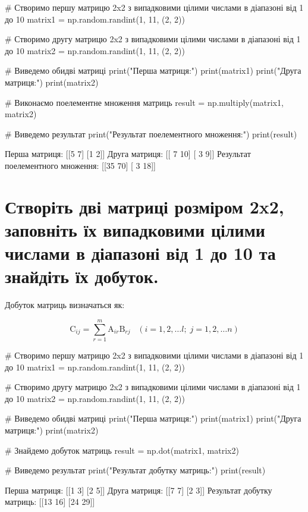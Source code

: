 \documentclass[]{article}
\newcounter{pythoncode}
\begin{document}
\begin{pythoncode}
    # Створимо першу матрицю 2x2 з випадковими цілими числами в діапазоні від 1 до 10
    matrix1 = np.random.randint(1, 11, (2, 2))

    # Створимо другу матрицю 2x2 з випадковими цілими числами в діапазоні від 1 до 10
    matrix2 = np.random.randint(1, 11, (2, 2))

    # Виведемо обидві матриці
    print("Перша матриця:")
    print(matrix1)
    print("Друга матриця:")
    print(matrix2)

    # Виконаємо поелементне множення матриць
    result = np.multiply(matrix1, matrix2)

    # Виведемо результат
    print("Результат поелементного множення:")
    print(result)
\end{pythoncode}

\begin{out}
	Перша матриця:
	[[5 7]
	 [1 2]]
	Друга матриця:
	[[ 7 10]
	 [ 3  9]]
	Результат поелементного множення:
	[[35 70]
	 [ 3 18]]
\end{out}

\section{Створіть дві матриці розміром 2x2, заповніть їх випадковими цілими числами в діапазоні від 1 до 10 та знайдіть їх добуток.}

Добуток матриць визначаться як:

\[\mathrm C_{ij} = \sum_{r=1}^m \mathrm A_{ir} \mathrm B_{rj} \;\;\; \left(i=1, 2, \ldots l;\; j=1, 2, \ldots n \right)\]

\begin{pythoncode}
    # Створимо першу матрицю 2x2 з випадковими цілими числами в діапазоні від 1 до 10
    matrix1 = np.random.randint(1, 11, (2, 2))

    # Створимо другу матрицю 2x2 з випадковими цілими числами в діапазоні від 1 до 10
    matrix2 = np.random.randint(1, 11, (2, 2))

    # Виведемо обидві матриці
    print("Перша матриця:")
    print(matrix1)
    print("Друга матриця:")
    print(matrix2)

    # Знайдемо добуток матриць
    result = np.dot(matrix1, matrix2)

    # Виведемо результат
    print("Результат добутку матриць:")
    print(result)
\end{pythoncode}

\begin{out}
	Перша матриця:
	[[1 3]
	 [2 5]]
	Друга матриця:
	[[7 7]
	 [2 3]]
	Результат добутку матриць:
	[[13 16]
	 [24 29]]
\end{out}
\end{document}
